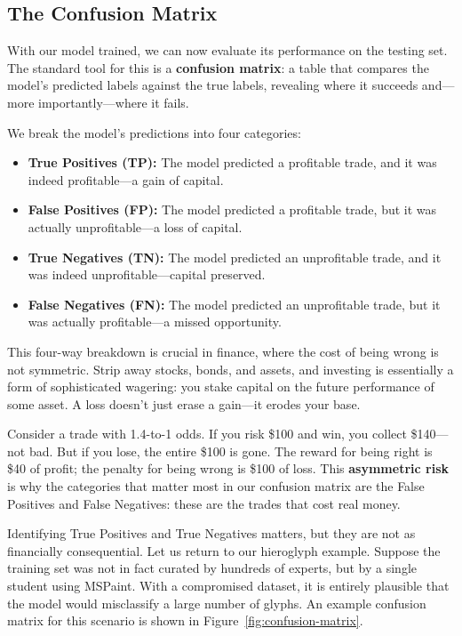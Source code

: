\subsection{The Confusion Matrix}
With our model trained, we can now evaluate its performance on the testing set. The standard tool for
this is a \textbf{confusion matrix}: a table that compares the model's predicted labels against the
true labels, revealing where it succeeds and---more importantly---where it fails.

We break the model's predictions into four categories:
\begin{itemize}
  \item \textbf{True Positives (TP):} The model predicted a profitable trade, and it was indeed
        profitable---a gain of capital.
  \item \textbf{False Positives (FP):} The model predicted a profitable trade, but it was actually
        unprofitable---a loss of capital.
  \item \textbf{True Negatives (TN):} The model predicted an unprofitable trade, and it was indeed
        unprofitable---capital preserved.
  \item \textbf{False Negatives (FN):} The model predicted an unprofitable trade, but it was actually
        profitable---a missed opportunity.
\end{itemize}

This four-way breakdown is crucial in finance, where the cost of being wrong is not symmetric. Strip
away stocks, bonds, and assets, and investing is essentially a form of sophisticated wagering: you
stake capital on the future performance of some asset. A loss doesn't just erase a gain---it erodes
your base.

Consider a trade with 1.4-to-1 odds. If you risk \$100 and win, you collect \$140---not bad. But if
you lose, the entire \$100 is gone. The reward for being right is \$40 of profit; the penalty for being
wrong is \$100 of loss. This \textbf{asymmetric risk} is why the categories that matter most in our
confusion matrix are the False Positives and False Negatives: these are the trades that cost real money.

Identifying True Positives and True Negatives matters, but they are not as financially consequential.
Let us return to our hieroglyph example. Suppose the training set was not in fact curated by hundreds
of experts, but by a single student using MSPaint. With a compromised dataset, it is entirely plausible
that the model would misclassify a large number of glyphs. An example confusion matrix for this
scenario is shown in Figure~\ref{fig:confusion-matrix}.

